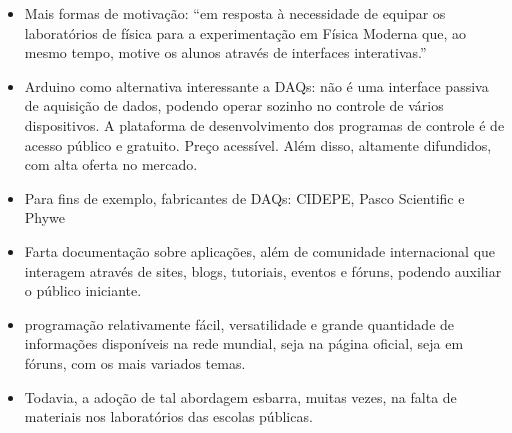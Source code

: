 \documentclass{article}
\begin{document}
\begin{itemize}
\begin{itemize}
		\item Mais formas de motivação: ``em resposta à necessidade de equipar os laboratórios de física para a experimentação em Física Moderna que, ao mesmo tempo, motive os alunos através de interfaces interativas.'' \cite{kit}
		\item Arduino como alternativa interessante a DAQs: não é uma interface passiva de aquisição de dados, podendo operar sozinho no controle de vários dispositivos. A plataforma de desenvolvimento dos programas de controle é de acesso público e gratuito. Preço acessível. Além disso, altamente difundidos, com alta oferta no mercado. \cite{aplaca}
		\item Para fins de exemplo, fabricantes de DAQs: CIDEPE, Pasco Scientific e Phywe \cite{iniciantes}
		\item Farta documentação sobre aplicações, além de comunidade internacional que interagem através de sites, blogs, tutoriais, eventos e fóruns, podendo auxiliar o público iniciante. \cite{aplaca}
		\item [\dots] programação relativamente fácil, versatilidade e grande quantidade de informações disponíveis na rede mundial, seja na página oficial, seja em fóruns, com os mais variados temas. \cite{kit}
		\item Todavia, a adoção de tal abordagem esbarra, muitas vezes, na falta de materiais nos laboratórios das escolas públicas. \cite{kit}
	\end{itemize}
\end{itemize}
\end{document}
